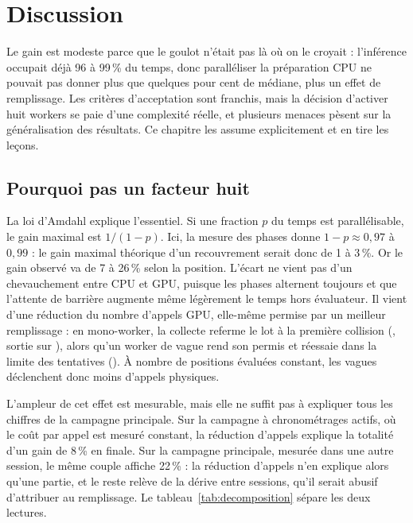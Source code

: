 \section{Discussion}
\label{sec:discussion}

\begin{resume}
Le gain est modeste parce que le goulot n'\'etait pas l\`a o\`u on le croyait :
l'inf\'erence occupait d\'ej\`a 96 \`a 99\,\% du temps, donc parall\'eliser la
pr\'eparation CPU ne pouvait pas donner plus que quelques pour cent de
m\'ediane, plus un effet de remplissage. Les crit\`eres d'acceptation sont
franchis, mais la d\'ecision d'activer huit workers se paie d'une complexit\'e
r\'eelle, et plusieurs menaces p\`esent sur la g\'en\'eralisation des
r\'esultats. Ce chapitre les assume explicitement et en tire les le\c{c}ons.
\end{resume}

\subsection{Pourquoi pas un facteur huit}

La loi d'Amdahl \cite{amdahl} explique l'essentiel. Si une fraction $p$ du
temps est parall\'elisable, le gain maximal est $1/(1-p)$. Ici, la mesure des
phases donne $1-p \approx 0,97$ \`a $0,99$ : le gain maximal th\'eorique d'un
recouvrement serait donc de 1 \`a 3\,\%. Or le gain observ\'e va de 7 \`a
26\,\% selon la position. L'\'ecart ne vient pas d'un chevauchement entre CPU
et GPU, puisque les phases alternent toujours et que l'attente de barri\`ere
augmente m\^eme l\'eg\`erement le temps hors \'evaluateur. Il vient d'une
r\'eduction du nombre d'appels GPU, elle-m\^eme permise par un meilleur
remplissage : en mono-worker, la collecte referme le lot \`a la premi\`ere
collision (, sortie sur ), alors qu'un
worker de vague rend son permis et r\'eessaie dans la limite des tentatives
(). \`A nombre de positions \'evalu\'ees constant, les
vagues d\'eclenchent donc moins d'appels physiques.

L'ampleur de cet effet est mesurable, mais elle ne suffit pas \`a expliquer
tous les chiffres de la campagne principale. Sur la campagne \`a
chronom\'etrages actifs, o\`u le co\^ut par appel est mesur\'e constant, la
r\'eduction d'appels explique la totalit\'e d'un gain de 8\,\% en finale. Sur
la campagne principale, mesur\'ee dans une autre session, le m\^eme couple
affiche 22\,\% : la r\'eduction d'appels n'en explique alors qu'une partie, et
le reste rel\`eve de la d\'erive entre sessions, qu'il serait abusif
d'attribuer au remplissage. Le tableau~\ref{tab:decomposition} s\'epare les
deux lectures.

